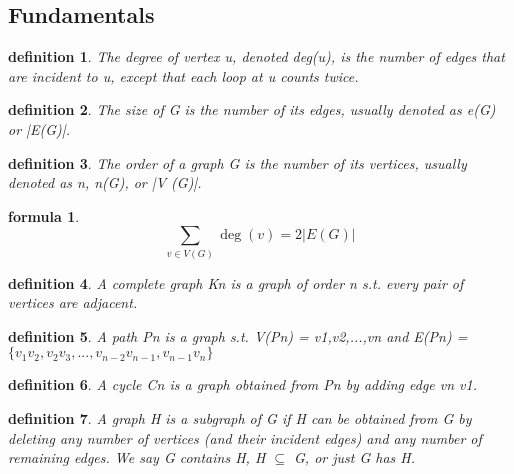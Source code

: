 \documentclass[twocolumn][2pt]{article}
\title{}
\newtheorem{definition}{definition}
\newtheorem{formula}{formula}
\begin{document}
\begin{CJK*}{UTF8}{bkai}


\section*{Fundamentals}

    \begin{definition}
        The degree of vertex u, denoted deg(u), is the number of edges that are
 incident to u, except that each loop at u counts twice.
    \end{definition}

    \begin{definition}
    The size of G is the number of its edges, usually denoted as e(G) or |E(G)|.
    \end{definition}
    
    \begin{definition}
        The order of a graph G is the number of its vertices, usually denoted as n,
 n(G), or |V (G)|.
    \end{definition}
    
    \begin{formula}
    \[
    \sum_{v \in V(G)} \deg(v) = 2 |E(G)|
    \]
    \end{formula}

    \begin{definition}
        A complete graph Kn is a graph of order n s.t. every pair of vertices are
 adjacent.
    \end{definition}

    \begin{definition}
        A path Pn is a graph s.t. V(Pn) = {v1,v2,...,vn} and
 E(Pn) = $\{v_{1}v_{2},v_{2}v_{3},...,v_{n−2}v_{n−1},v_{n−1}v_{n}\}$
    \end{definition}

    \begin{definition}
        A cycle Cn is a graph obtained from Pn by adding edge vn v1.
    \end{definition}

    \begin{definition}
     A graph H is a subgraph of G if H can be obtained from G by deleting any
 number of vertices (and their incident edges) and any number of remaining
 edges. We say G contains H, H $\subseteq$ G, or just G has H.        
    \end{definition}
    

\end{CJK*}
\end{document}
